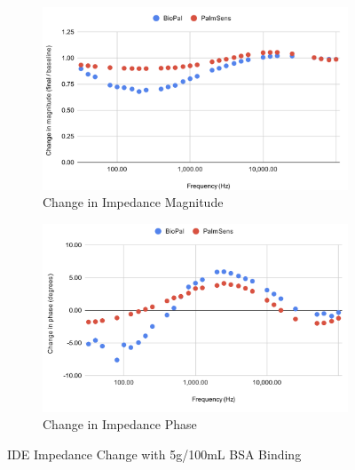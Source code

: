 \begin{figure}[H]
    \centering
    \begin{subfigure}{0.48\textwidth}   
        \includegraphics[width=\textwidth]{5g:100mL mag.png}
        \caption{Change in Impedance Magnitude}
        \label{fig:5g_mag}
    \end{subfigure}
    \hfill
    \begin{subfigure}{0.48\textwidth}
        \includegraphics[width=\textwidth]{5g:100mL phase.png}
        \caption{Change in Impedance Phase}
        \label{fig:5g_phase}
    \end{subfigure}
    \caption{IDE Impedance Change with 5g/100mL BSA Binding}
    \label{fig:5g_bsa_comparison}
\end{figure}

